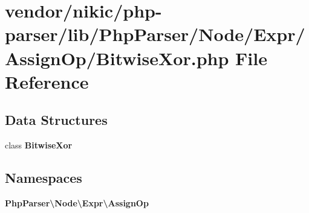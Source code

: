 \section{vendor/nikic/php-\/parser/lib/\+Php\+Parser/\+Node/\+Expr/\+Assign\+Op/\+Bitwise\+Xor.php File Reference}
\label{_assign_op_2_bitwise_xor_8php}
\subsection*{Data Structures}
\begin{DoxyCompactItemize}
\item 
class {\bf Bitwise\+Xor}
\end{DoxyCompactItemize}
\subsection*{Namespaces}
\begin{DoxyCompactItemize}
\item 
 {\bf Php\+Parser\textbackslash{}\+Node\textbackslash{}\+Expr\textbackslash{}\+Assign\+Op}
\end{DoxyCompactItemize}
